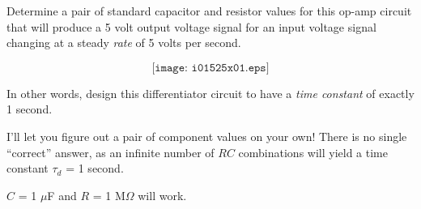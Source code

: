 

Determine a pair of standard capacitor and resistor values for this op-amp circuit that will produce a 5 volt output voltage signal for an input voltage signal changing at a steady {\it rate} of 5 volts per second.

$$\texttt{[image: i01525x01.eps]}$$

In other words, design this differentiator circuit to have a {\it time constant} of exactly 1 second.







I'll let you figure out a pair of component values on your own!  There is no single ``correct'' answer, as an infinite number of $RC$ combinations will yield a time constant $\tau_d$ = 1 second.







$C$ = 1 $\mu$F and $R$ = 1 M$\Omega$ will work.





